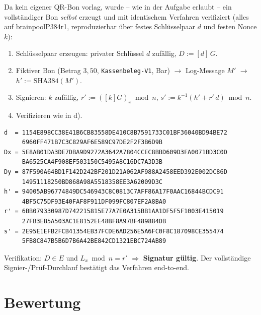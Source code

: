 \documentclass[
    fontsize=12pt,          %
    paper=a4,               %
    numbers=noenddot,       %
    listof=totoc,           %
    listof=entryprefix,     %
    listof=nochaptergap,    %
    bibliography=totoc,     %
    parskip=half,           %
    openany                 %
]{scrbook}
\begin{document}
Da kein eigener QR-Bon vorlag, wurde -- wie in der Aufgabe erlaubt -- ein vollständiger
Bon \emph{selbst} erzeugt und mit identischem Verfahren verifiziert (alles auf brainpoolP384r1,
reproduzierbar über festes Schlüsselpaar $d$ und festen Nonce $k$):

\begin{enumerate}
    \item Schlüsselpaar erzeugen: privater Schlüssel $d$ zufällig, $D := [d]\,G$.
    \item Fiktiver Bon (Betrag $3{,}50$, \texttt{Kassenbeleg-V1}, Bar) $\rightarrow$ Log-Message $M'$
          $\rightarrow$ $h' := \mathrm{SHA384}(M')$.
    \item Signieren: $k$ zufällig, $r' := ([k]G)_x \bmod n$, \;$s' := k^{-1}(h' + r'\,d) \bmod n$.
    \item Verifizieren wie in d).
\end{enumerate}

\begin{lstlisting}[caption={Selbst erzeugter Bon -- Schlüssel, Hash und Signatur}]
d  = 1154E898CC38E41B6CB83558DE410C8B7591733C01BF36040BD94BE72
     6960FF471B7C3C829AF6E589C97DE2F2F3B6D9B
Dx = 5E8AB01DA3DE7DBA9D9272A3642A7804CCEC8BBD609D3FA0071BD3C0D
     BA6525CA4F908EF503150C5495A8C16DC7A3D3B
Dy = 87F590A64BD1F142D242BF201D21A062AF988A2458EED392E002DC86D
     14951118250BD868A98A5518358EE3A62009D3C
h' = 94005AB96774849DC546943C8C0813C7AFF86A17F0AAC16844BCDC91
     4BF5C75DF93E40FAF8F911DF099FC807EF2A8BA0
r' = 6BB079330987D742215815E77A7E0A315BB1AA1DF5F5F1003E415019
     27FB3EB5A503AC1E8152EE48BF8A97BF489884DB
s' = 2E95E1EFB2FCB41354EB37FCDE6AD256E5A6FC0F8C187098CE355474
     5FB8C847B5B6D7B6A42BE842CD1321EBC724AB89
\end{lstlisting}

\noindent Verifikation: $D \in E$ \checkmark{} und $L_x \bmod n = r'$ \checkmark{}
$\Rightarrow$ \textbf{Signatur gültig}. Der vollständige Signier-/Prüf-Durchlauf bestätigt das
Verfahren end-to-end.


\section*{Bewertung}
\end{document}
